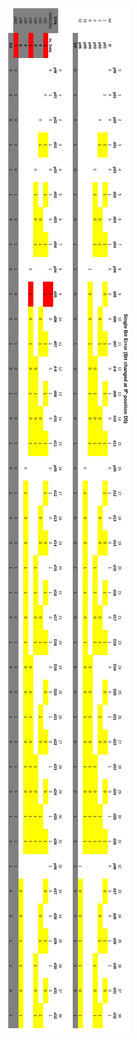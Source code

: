 \documentclass[a4paper,11pt]{article}%
\newenvironment{qanda}{\setlength{\parindent}{0pt}}{\bigskip}
\begin{document}
\begin{qanda}
	\begin{figure}[H]
		\centering
		\includegraphics[scale=0.6]{figures/q1.png}
	\end{figure}
	

\end{qanda}
\end{document}
